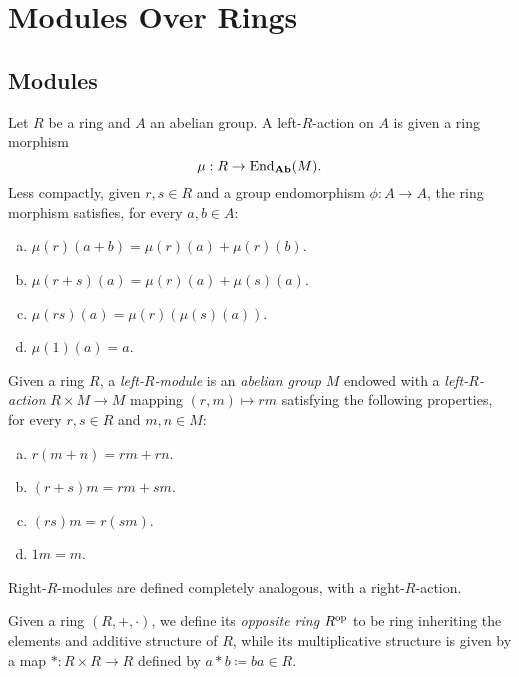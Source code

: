 \section{Modules Over Rings}

\subsection{Modules}

\begin{definition}
\label{def:ring-action}
Let \(R\) be a ring and \(A\) an abelian group. A left-\(R\)-action on \(A\) is
given a ring morphism
\[
\mu: R \to \operatorname{End}_{{\textbf{Ab}}}(M).
\]
Less compactly, given \(r, s \in R\) and a group endomorphism \(\phi: A \to A\),
the ring morphism satisfies, for every \(a, b \in A\):
\begin{enumerate}[(a)]\setlength\itemsep{0em}
\item \(\mu(r)(a + b) = \mu(r)(a) + \mu(r)(b)\).
\item \(\mu(r + s)(a) = \mu(r)(a) + \mu(s)(a)\).
\item \(\mu(r s)(a) = \mu(r)(\mu(s)(a))\).
\item \(\mu(1)(a) = a\).
\end{enumerate}
\end{definition}

\begin{definition}[Module]
\label{def:module}
Given a ring \(R\), a \emph{left-\(R\)-module} is an \emph{abelian group} \(M\)
endowed with a \emph{left-\(R\)-action} \(R \times M \to M\) mapping
\((r, m) \mapsto r m\) satisfying the following properties, for every
\(r, s \in R\) and \(m, n \in M\):
\begin{enumerate}[(a)]\setlength\itemsep{0em}
\item \(r (m + n) = r m + r n\).
\item \((r + s) m = r m + s m\).
\item \((r s) m = r (s m)\).
\item \(1 m = m\).
\end{enumerate}
Right-\(R\)-modules are defined completely analogous, with a right-\(R\)-action.
\end{definition}

\begin{definition}
\label{def:opposite-ring}
Given a ring \((R, +, \cdot)\), we define its \emph{opposite ring} \(R^{\mathrm{op}}\)
to be ring inheriting the elements and additive structure of \(R\), while its
multiplicative structure is given by a map \(*: R \times R \to R\) defined by
\(a * b \coloneq b a \in R\).
\end{definition}

